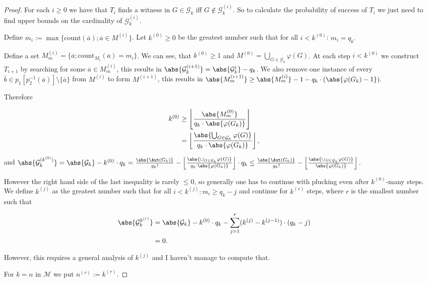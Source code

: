 \begin{proof}
For each $i\geq 0$ we have that $T_i$ finds a witness in $G\in\mathcal{G}_k$ iff $G\not\in\mathcal{G}_k^{(i)}$. So to calculate the probability of success of $T_i$ we just need to find upper bounds on the cardinality of $\mathcal{G}_k^{(i)}$. 

Define $m_i:=\max\{\text{count}(\overline a);\overline a \in M^{(i)}\}$. Let $k^{(0)}\geq 0$ be the greatest number such that for all $i<k^{(0)}$: 
\(m_i=q_k.\) 

Define a set $M_m^{(i)}=\{\overline a;\text{count}_{M_i}(\overline a)=m_i\}$. We can see, that $k^{(0)}\geq1$ and $M^{(0)}=\bigcup_{G\in\mathcal{G}_k}\varphi(G)$. At each step $i<k^{(0)}$ we construct $T_{i+1}$ by searching for some $\overline a \in M_{m}^{(i)}$, this results in $\abs{\mathcal{G}_k^{(i+1)}}=\abs{\mathcal{G}_k^{i}}-q_k$. We also remove one instance of every $\overline b \in p_1[p_2^{-1}(\overline a)]\setminus\{\overline a\}$ from $M^{(i)}$ to form $M^{(i+1)}$, this results in $\abs{M^{(i+1)}_m}\geq \abs{M^{(i)}_m}-1-q_k\cdot(\abs{\varphi(G_k)-1}).$

Therefore 

\begin{align}
k^{(0)}&\geq \left \lfloor \frac{\abs{M^{(0)}_m}}{q_k\cdot\abs{\varphi(G_k)}} \right \rfloor\\
&=
\left\lfloor\frac{\abs{\bigcup_{G\in\mathcal{G}_k}\varphi(G)}}{q_k\cdot\abs{\varphi(G_k)}}\right\rfloor
,
\end{align}

and $\abs{\mathcal{G}_k^{(k^{(0)})}}=\abs{\mathcal{G}_k}-k^{(0)}\cdot q_k=\frac{\abs{\Aut(G_k)}}{g_k!}-\left\lfloor\frac{\abs{\cup_{G\in\mathcal{G}_k}\varphi(G)}}{q_k\cdot\abs{\varphi(G_k)}}\right\rfloor\cdot q_k\leq \frac{\abs{\Aut(G_k)}}{g_k!}-\left\lfloor\frac{\abs{\cup_{G\in\mathcal{G}_k}\varphi(G)}}{\abs{\varphi(G_k)}} \right \rfloor.$

However the right hand side of the last inequality is rarely $\leq 0$, so generally one has to continue with plucking even after $k^{(0)}$-many steps. We define $k^{(j)}$ as the greatest number such that for all $i<k^{(j)}:m_i\geq q_k-j$ and continue for $k^{(r)}$ steps, where $r$ is the smallest number such that


\begin{align}
\abs{\mathcal{G}_{k}^{k^{(r)}}}&=\abs{\mathcal{G}_k}-k^{(0)}\cdot q_k- \sum_{j=1}^{r}(k^{(j)}-k^{(j-1)})\cdot (q_k - j)\\
&=0.
\end{align}

However, this requires a general analysis of $k^{(j)}$ and I haven't manage to compute that.

For $k=n$ in $\mathcal{M}$ we put $n^{(r)}:=k^{(r)}.$
\end{proof}

